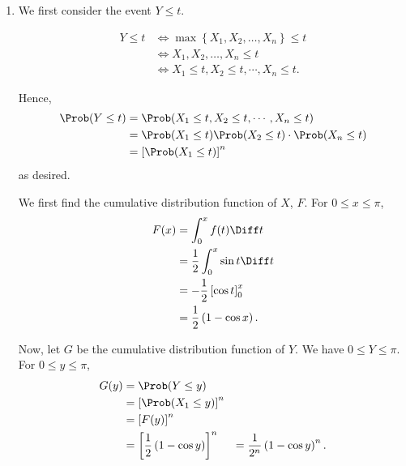 \Question{\currfilebase}

\begin{enumerate}
    \item We first consider the event \(Y \leq t\).

          \begin{align*}
              Y \leq t & \iff \max \left\{X_1, X_2, \ldots, X_n\right\} \leq t \\
                       & \iff X_1, X_2, \ldots, X_n \leq t                     \\
                       & \iff X_1 \leq t, X_2 \leq t, \cdots, X_n \leq t.
          \end{align*}

          Hence,
          \begin{align*}
              \Prob(Y \leq t) & = \Prob(X_1 \leq t, X_2 \leq t, \cdots, X_n \leq t)           \\
                              & = \Prob(X_1 \leq t) \Prob(X_2 \leq t) \cdot \Prob(X_n \leq t) \\
                              & = \left[\Prob(X_1 \leq t)\right]^n
          \end{align*}
          as desired.

          We first find the cumulative distribution function of \(X\), \(F\). For \(0 \leq x \leq \pi\),
          \begin{align*}
              F(x) & = \int_{0}^{x} f(t) \Diff t                 \\
                   & = \frac{1}{2} \int_{0}^{x} \sin t \Diff t   \\
                   & = - \frac{1}{2} \left[\cos t\right]_{0}^{x} \\
                   & = \frac{1}{2} \left(1 - \cos x\right).
          \end{align*}

          Now, let \(G\) be the cumulative distribution function of \(Y\). We have \(0 \leq Y \leq \pi\). For \(0 \leq y \leq \pi\),
          \begin{align*}
              G(y) & = \Prob(Y \leq y)                                    \\
                   & = \left[\Prob(X_1 \leq y)\right]^n                   \\
                   & = \left[F(y)\right]^n                                \\
                   & = \left[\frac{1}{2} \left(1 - \cos y\right)\right]^n
                   & = \frac{1}{2^n} \left(1 - \cos y\right)^n.
          \end{align*}


\end{enumerate}
